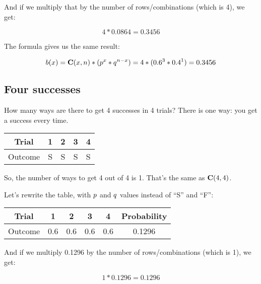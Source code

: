 \documentclass[../../../main.tex]{subfiles}
\begin{document}
\noindent
And if we multiply that by the number of rows/combinations (which is 4), we get:

\begin{equation*}
    4 * 0.0864 = 0.3456
\end{equation*}

\noindent
The formula gives us the same result:

\begin{equation*}
  \Binom{\RandVarVal/} = \combs{\RandVarVal/}{n} * (p^{\RandVarVal/} * q^{n - \RandVarVal/}) = 4 * (0.6^{3} * 0.4^{1}) = 0.3456
\end{equation*}


\subsection{Four successes}

How many ways are there to get 4 successes in 4 trials? There is one way: you get a success every time.

\begin{center}
  \begin{tabular}{| c | c | c | c | c |}
    \hline
    \textbf{Trial} & \textbf{1} & \textbf{2} & \textbf{3} & \textbf{4} \\ \hline
  Outcome & S & S & S & S \\ \hline
  \end{tabular}
\end{center}

\noindent
So, the number of ways to get 4 out of 4 is 1. That's the same as $\mathbf{C}(4, 4)$. 

Let's rewrite the table, with $\success/$ and $\failure/$ values instead of ``S'' and ``F'':

\begin{center}
  \begin{tabular}{| c | c | c | c | c | c |}
    \hline
    \textbf{Trial} & \textbf{1} & \textbf{2} & \textbf{3} & \textbf{4} & \textbf{Probability} \\ \hline
  Outcome & 0.6 & 0.6 & 0.6 & 0.6 & 0.1296 \\ \hline
  \end{tabular}
\end{center}

\noindent
And if we multiply 0.1296 by the number of rows/combinations (which is 1), we get:

\begin{equation*}
    1 * 0.1296 = 0.1296
\end{equation*}
\end{document}
